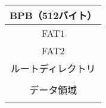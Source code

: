 \documentclass[border=1mm]{standalone}
\begin{document}
\begin{tabular}{|c|}
  \hline
  BPB（512バイト） \\\hline
  FAT1 \\\hline
  FAT2 \\\hline
  ルートディレクトリ \\\hline
  \\ データ領域 \\\\\hline
\end{tabular}
\end{document}
